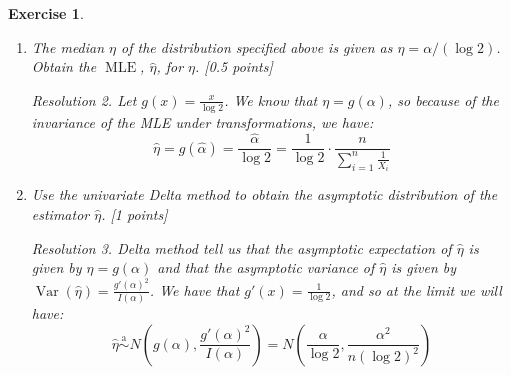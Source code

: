 \documentclass[10pt,a4paper]{article}
\theoremstyle{plain}
\newtheorem{exercice}{Exercise}
\theoremstyle{remark}
\newtheorem*{resolution}{Resolution}
\DeclareMathOperator{\MLE}{MLE} %
\DeclareMathOperator{\Var}{Var} %
\begin{document}
\begin{exercice}
\begin{enumerate}
\begin{resolution}
            But we know that the asymptotic distribution of $\hat\alpha$ is normal with expectation $\alpha$ and variance ${I(\alpha)}^{-1}$. So finally we get:
            $$\hat\alpha\overset{\text{a}}{\sim}N\left(\alpha,\frac{\alpha^2}{n}\right)$$
          \end{resolution}
    \item The median $\eta$ of the distribution specified above is given as $\eta=\alpha/(\log 2)$. Obtain the $\MLE$, $\hat{\eta}$, for $\eta$. [0.5 points]
          \begin{resolution}
            Let $g(x)=\frac{x}{\log 2}$. We know that $\eta=g(\alpha)$, so because of the invariance of the MLE under transformations, we have:
            $$\hat\eta=g(\hat\alpha)=\frac{\hat\alpha}{\log 2}=\frac{1}{\log 2}\cdot\frac{n}{\sum_{i=1}^n\frac{1}{X_i}}$$
          \end{resolution}
    \item Use the univariate Delta method to obtain the asymptotic distribution of the estimator $\hat\eta$. [1 points]
          \begin{resolution}
            Delta method tell us that the asymptotic expectation of $\hat\eta$ is given by $\eta=g(\alpha)$ and that the asymptotic variance of $\hat\eta$ is given by $\Var(\hat\eta)=\frac{{g'(\alpha)}^2}{I(\alpha)}$. We have that $g'(x)=\frac{1}{\log 2}$, and so at the limit we will have:
            $$\hat\eta\overset{\text{a}}{\sim}N\left(g(\alpha),\frac{{g'(\alpha)}^2}{I(\alpha)}\right)=N\left(\frac{\alpha}{\log 2},\frac{\alpha^2}{n{(\log 2)}^2}\right)$$
          \end{resolution}
  \end{enumerate}
\end{exercice}
\end{document}
